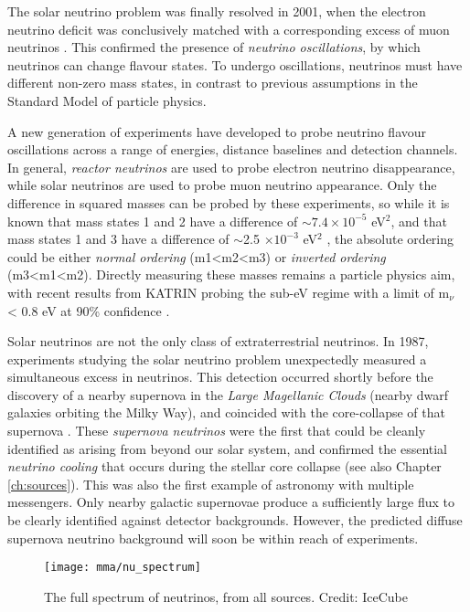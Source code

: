 The solar neutrino problem was finally resolved in 2001, when the electron neutrino deficit was conclusively matched with a corresponding excess of muon neutrinos . This confirmed the presence of \emph{neutrino oscillations}, by which neutrinos can change flavour states. To undergo oscillations, neutrinos must have different non-zero mass states, in contrast to previous assumptions in the Standard Model of particle physics. 

A new generation of experiments have developed to probe neutrino flavour oscillations across a range of energies, distance baselines and detection channels. In general, \emph{reactor neutrinos} are used to probe electron neutrino disappearance, while solar neutrinos are used to probe muon neutrino appearance. Only the difference in squared masses can be probed by these experiments, so while it is known that mass states 1 and 2 have a difference of $\sim7.4 \times 10^{-5}$ eV$^{2}$, and that mass states 1 and 3  have a difference of $\sim$2.5 $\times 10^{-3}$ eV$^{2}$ , the absolute ordering could be either \emph{normal ordering} (m1<m2<m3) or \emph{inverted ordering} (m3<m1<m2). Directly measuring these masses remains a particle physics aim, with recent results from KATRIN probing the sub-eV regime with a limit of m$_{\nu}$ < 0.8 eV at 90\% confidence . 

Solar neutrinos are not the only class of extraterrestrial neutrinos. In 1987, experiments studying the solar neutrino problem unexpectedly measured a simultaneous excess in neutrinos. This detection occurred shortly before the discovery of a nearby supernova in the \emph{Large Magellanic Clouds} (nearby dwarf galaxies orbiting the Milky Way), and coincided with the core-collapse of that supernova . These \emph{supernova neutrinos} were the first that could be cleanly identified as arising from beyond our solar system, and confirmed the essential \emph{neutrino cooling} that occurs during the stellar core collapse (see also Chapter \ref{ch:sources}). This was also the first example of astronomy with multiple messengers. Only nearby galactic supernovae produce a sufficiently large flux to be clearly identified against detector backgrounds. However, the predicted diffuse supernova neutrino background will soon be within reach of experiments.

\begin{figure}[!ht]
	\texttt{[image: mma/nu\_spectrum]}
	\caption{The full spectrum of neutrinos, from all sources. Credit: IceCube}
	\label{fig:nu_spectrum}
\end{figure}

